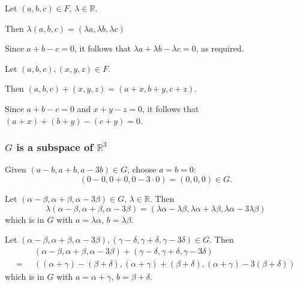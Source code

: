 \documentclass[11pt]{article}
\newcommand{\R}{\mathbb{R}}
\theoremstyle{definition}
\theoremstyle{plain}
\theoremstyle{remark}
\newcounter{subsubsubsection}[subsubsection]
\begin{document}
\begin{enumerate}

          Let \((a, b, c) \in F\), \(\lambda \in \R\).

          Then \(\lambda (a, b, c) = (\lambda a, \lambda b, \lambda c)\)

          Since \(a + b - c = 0\), it follows that \(\lambda a + \lambda b - \lambda c = 0\), as required.


          Let \((a, b, c), (x, y, z) \in F\).

          Then \( (a, b, c) + (x, y, z) = (a + x, b + y, c + z) \).

          Since \(a + b - c = 0\) and \(x + y - z = 0\), it follows that \((a + x) + (b + y) - (c + y) = 0\).

          \subsubsection*{\(G\) is a subspace of \(\R^3\)}


          Given \((a - b, a + b, a - 3b) \in G\), choose \(a = b = 0\):
          \[
              (0 - 0, 0 + 0, 0 - 3 \cdot 0) = (0, 0, 0) \in G.
          \]


          Let \((\alpha - \beta, \alpha + \beta, \alpha - 3\beta) \in G\), \(\lambda \in \R\).  Then
          \[
              \lambda (\alpha - \beta, \alpha + \beta, \alpha - 3\beta) = (\lambda \alpha - \lambda \beta, \lambda \alpha + \lambda \beta, \lambda \alpha - 3\lambda \beta)
          \]
          which is in \(G\) with \(a = \lambda \alpha\), \(b = \lambda \beta\).


          Let \((\alpha - \beta, \alpha + \beta, \alpha - 3\beta), (\gamma - \delta, \gamma + \delta, \gamma - 3\delta) \in G\).  Then
          \[
              \begin{aligned}
                         & (\alpha - \beta, \alpha + \beta, \alpha - 3\beta) + (\gamma - \delta, \gamma + \delta, \gamma - 3\delta)            \\
                  = \;\; & ((\alpha + \gamma) - (\beta + \delta), (\alpha + \gamma) + (\beta + \delta), (\alpha + \gamma) - 3(\beta + \delta))
              \end{aligned}
          \]
          which is in \(G\) with \(a = \alpha + \gamma\), \(b = \beta + \delta\).


\end{enumerate}
\end{document}
